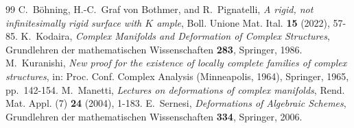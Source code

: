 \documentclass[10pt,a4paper]{amsart}
\numberwithin{equation}{section}
\begin{document}
\begin{thebibliography}{99}
 C.~B\"ohning, H.-C.~Graf von Bothmer, and R.~Pignatelli, \emph{A rigid, not infinitesimally rigid surface with $K$ ample}, Boll. Unione Mat. Ital. \textbf{15} (2022), 57-85.
 K.~Kodaira, \emph{Complex Manifolds and Deformation of Complex Structures}, Grundlehren der mathematischen Wissenschaften \textbf{283}, Springer, 1986.
 M.~Kuranishi, \emph{New proof for the existence of locally complete families of complex structures}, in: Proc. Conf. Complex Analysis (Minneapolis, 1964), Springer, 1965, pp.~142-154.
 M.~Manetti, \emph{Lectures on deformations of complex manifolds}, Rend. Mat. Appl. (7) \textbf{24} (2004), 1-183.
 E.~Sernesi, \emph{Deformations of Algebraic Schemes}, Grundlehren der mathematischen Wissenschaften \textbf{334}, Springer, 2006.
\end{thebibliography}
\end{document}

